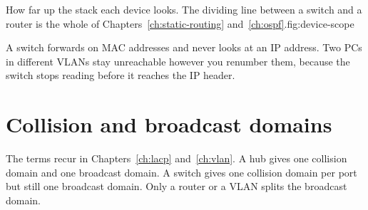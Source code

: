 \begin{utpfig}{How far up the stack each device looks. The dividing
line between a switch and a router is the whole of Chapters~\ref{ch:static-routing}
and~\ref{ch:ospf}.}{fig:device-scope}
\end{utpfig}

\begin{keyidea}
A switch forwards on MAC addresses and never looks at an IP address.
Two PCs in different VLANs stay unreachable however you renumber them,
because the switch stops reading before it reaches the IP header.
\end{keyidea}

\section{Collision and broadcast domains}
The terms recur in Chapters~\ref{ch:lacp} and~\ref{ch:vlan}. A hub gives
one collision domain and one broadcast domain. A switch gives one
collision domain per port but still one broadcast domain. Only a router
or a VLAN splits the broadcast domain.

